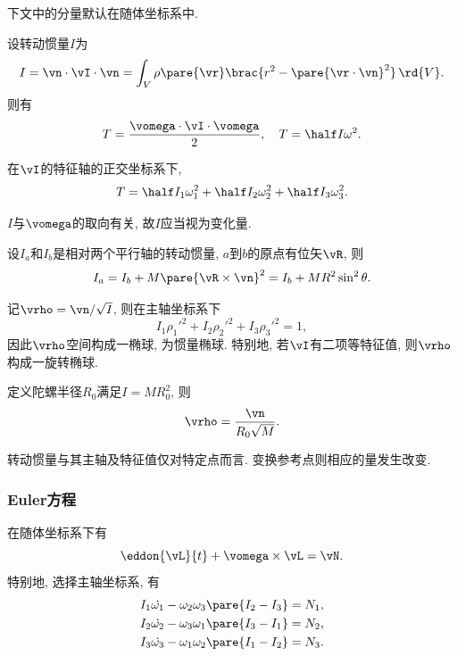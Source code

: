 \documentclass[../TheoreticalMechanics.tex]{subfiles}
\begin{document}
\begin{remark}
    下文中的分量默认在随体坐标系中.
\end{remark}
\begin{finale}
    \begin{theorem}[动能对转动惯量]
        设转动惯量$I$为
        \[ I = \vn\cdot\vI\cdot\vn = \int_V \rho\pare{\vr}\brac{r^2-\pare{\vr\cdot\vn}^2}\,\rd{V}. \]
        则有
        \[ T = \frac{\vomega\cdot\vI\cdot\vomega}{2},\quad  T = \half I\omega^2. \]
    \end{theorem}
\end{finale}
\begin{corollary}[主轴下的动能]
    在$\vI$的特征轴的正交坐标系下,
    \[ T = \half I_1 \omega_1^2 + \half I_2 \omega_2^2 + \half I_3 \omega_3^2. \]
\end{corollary}
\begin{pitfall}
    $I$与$\vomega$的取向有关, 故$I$应当视为变化量.
\end{pitfall}
\begin{theorem}[平行轴定理]
    设$I_a$和$I_b$是相对两个平行轴的转动惯量, $a$到$b$的原点有位矢$\vR$, 则
    \[ I_a = I_b + M\pare{\vR\times\vn}^2 = I_b + MR^2\sin^2\theta. \]
\end{theorem}
\begin{lemma}[惯量椭球]
    记$\vrho = \vn/\sqrt{I}$, 则在主轴坐标系下
    \[ I_1 \rho_1'^2 + I_2\rho_2'^2 + I_3\rho_3'^2 = 1, \]
    因此$\vrho$空间构成一椭球, 为惯量椭球. 特别地, 若$\vI$有二项等特征值, 则$\vrho$构成一旋转椭球.
\end{lemma}
\begin{lemma}[陀螺半径]
    定义陀螺半径$R_0$满足$I = MR_0^2$, 则
    \[ \vrho = \frac{\vn}{R_0\sqrt{M}}. \]
\end{lemma}
\begin{pitfall}
    转动惯量与其主轴及特征值仅对特定点而言. 变换参考点则相应的量发生改变.
\end{pitfall}


\subsubsection{Euler方程} %
\label{ssub:euler方程}

\begin{theorem}[Euler方程]
    \label{thm:刚体运动的Euler方程}
    在随体坐标系下有
    \[ \eddon{\vL}{t} + \vomega\times\vL = \vN. \]
    特别地, 选择主轴坐标系, 有
    \begin{align*}
        I_1\dot{\omega_1} - \omega_2\omega_3\pare{I_2-I_3} &= N_1,\\
        I_2\dot{\omega_2} - \omega_3\omega_1\pare{I_3-I_1} &= N_2,\\
        I_3\dot{\omega_3} - \omega_1\omega_2\pare{I_1-I_2} &= N_3.
    \end{align*}
\end{theorem}
\end{document}
